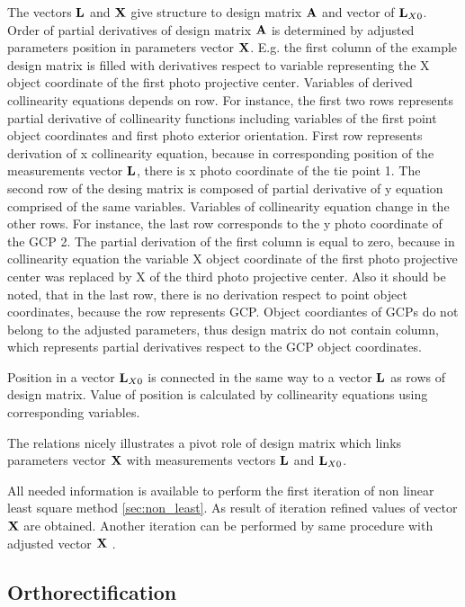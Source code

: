 \documentclass[a4paper,12pt]{article}
\newcommand{\evect}[1]{
{\bf #1}
}
\begin{document}
The vectors  $\evect{L}$ and  $\evect{X}$ give structure to design matrix $\evect{A}$ and
vector of $\evect{L}_{X0}$.
Order of partial derivatives of design matrix $\evect{A}$  is determined by adjusted parameters position in 
parameters vector $\evect{X}$. E.g. the first column of the example design matrix is filled with derivatives respect 
to variable representing the  X object coordinate of the first photo projective center. Variables of derived collinearity equations
depends on row. For instance, the first two rows represents partial derivative of collinearity functions 
including variables of the first point object coordinates  and first photo exterior orientation.  First row represents  
derivation of x collinearity equation, because in corresponding position of the measurements vector $\evect{L}$, there is 
x photo coordinate of the tie point 1. The second row of the desing matrix is composed of 
partial derivative of y equation comprised of the same variables. 
Variables of collinearity equation change in the other rows. For instance, the last row corresponds to the 
y photo coordinate of the GCP 2. The partial derivation of the first column is equal 
to zero, because in collinearity equation the variable X object coordinate of the first photo projective center was replaced 
by X of the third photo projective center. Also it should be noted, that in the last row, there is no derivation 
respect to point object coordinates, because the row represents GCP. Object coordiantes of GCPs do not 
belong to the adjusted parameters, thus design matrix do not contain column, which represents partial 
derivatives respect to the GCP object coordinates.


Position in a vector $\evect{L}_{X0}$ is connected in the same way to a vector $\evect{L}$ as rows of design matrix.
Value of position is calculated by collinearity equations using corresponding variables.



The relations nicely illustrates a pivot role of design matrix which links parameters vector $\evect{X}$ 
with measurements vectors $\evect{L}$ and $\evect{L}_{X0}$.

All needed information is available to perform the first iteration of non linear least square 
method \ref{sec:non_least}. As result of iteration refined values of vector  $\evect{X}$
are obtained. Another iteration can be  performed by same procedure  with adjusted vector $\evect{X}$
.

\subsection{Orthorectification}
\end{document}
